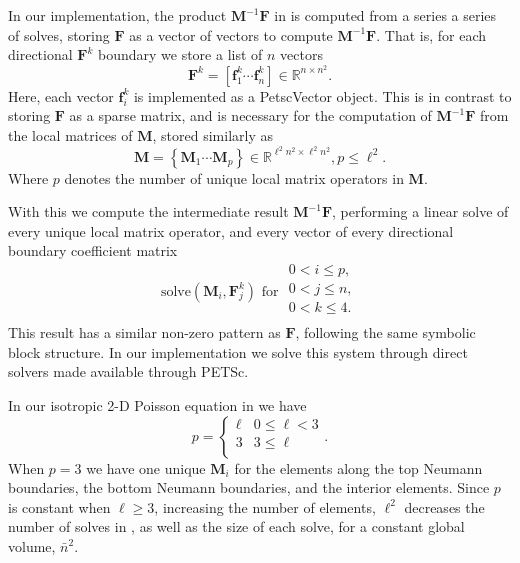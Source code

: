 %
%
%
\noindent
In our implementation, the product $\textbf{M}^{-1}\textbf{F}$ in  is computed from a series a series of solves, storing $\textbf{F}$ as a vector of vectors to compute $\textbf{M}^{-1}\textbf{F}$. 
That is, for each directional $\textbf{F}^k$ boundary we store a list of $n$ vectors
\begin{equation}
	\textbf{F}^k = \left[\textbf{f}^k_1 \cdots \textbf{f}^k_n\right] 
	\in \mathbb{R}^{n \times n^2}.
\end{equation} 
\noindent
Here, each vector $\textbf{f}^k_i$ is implemented as a PetscVector object.
This is in contrast to storing $\textbf{F}$ as a sparse matrix, and is necessary for the computation of $\textbf{M}^{-1}\textbf{F}$ from the local 
matrices of $\textbf{M}$, stored similarly as
\begin{equation}
	\textbf{M} = \left\{\textbf{M}_1 \cdots \textbf{M}_p\right\} \in 
	\mathbb{R}^{\ell^2 n^2 \times \ell^2 n^2}, p \leq \ell^2.
\end{equation} 
\noindent 
Where $p$ denotes the number of unique local matrix operators in 
$\textbf{M}$. 

%
%
%
With this we compute the intermediate result $\textbf{M}^{-1}\textbf{F}$, performing a linear solve of every unique local matrix operator, and every vector of every directional boundary coefficient matrix 
\begin{equation}
	\text{solve}(\textbf{M}_{i}, \textbf{F}^{k}_j) \text{  for }
	\begin{array}{l}
		0 < i \leq p, \\
		0 < j \leq n, \\
		0 < k \leq 4. \\ 
	\end{array}
	\label{eqn:mfsolves}
\end{equation}
\noindent
This result has a similar non-zero pattern as $\textbf{F}$, following the same symbolic block structure. 
In our implementation we solve this system through direct solvers made available through PETSc. 

%
%
%
\begin{aside}
	In our isotropic 2-D Poisson equation in  we have 
	\begin{equation}
		p = \begin{cases}
		    \ell &  0 \leq \ell < 3 \\ 
			3 &  3 \leq \ell \\ 
		\end{cases}.
	\end{equation} 
	\noindent 
	When $p = 3$ we have one unique $\textbf{M}_i$ for the elements along the top Neumann boundaries, the bottom Neumann boundaries, and the interior elements. 
	Since $p$ is constant when $\ell \geq 3$, increasing the number of elements, $\ell^2$ decreases the number of solves in , as well as the size of each solve, for a constant global volume, $\bar{n}^2$. 
\end{aside}

